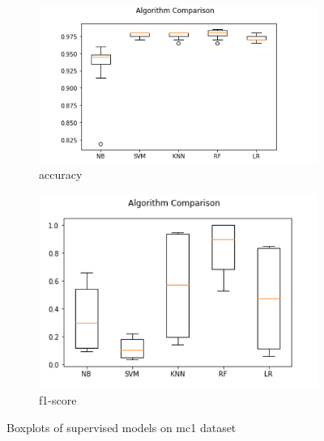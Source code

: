 \begin{figure}[h!]
  \centering
  \begin{subfigure}[b]{0.4\linewidth}
    \includegraphics[width=\linewidth]{report/mc1.png}
    \caption{accuracy}
  \end{subfigure}
  \begin{subfigure}[b]{0.4\linewidth}
    \includegraphics[width=\linewidth]{report/mc1_f.png}
    \caption{f1-score}
  \end{subfigure}
  \caption{Boxplots of supervised models on mc1 dataset}
\end{figure}

